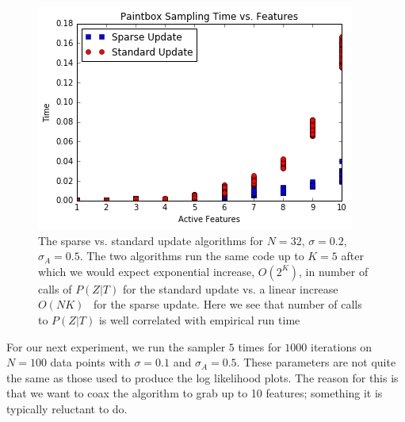 \documentclass{article}
\begin{document}
\begin{figure}[ht]
\vskip 0.2in
\begin{center}
\centerline{\includegraphics[width=\columnwidth]{alg_scatter}}
\caption{The sparse vs. standard update algorithms for $N = 32$, $\sigma = 0.2$, $\sigma_A = 0.5$.  The two algorithms run the same code up to $K = 5$ after which we would expect exponential increase, $O(2^K)$, in number of calls of $P(Z|T)$ for the standard update vs. a linear increase $O(NK)$ \ for the sparse update.  Here we see that number of calls to $P(Z|T)$ is well correlated with empirical run time}
\label{alg_scatter}
\end{center}
\vskip -0.2in
\end{figure}

For our next experiment, we run the sampler $5$ times for $1000$ iterations on $N = 100$ data points with $\sigma = 0.1$ and $\sigma_A = 0.5$.  These parameters are not quite the same as those used to produce the log likelihood plots.  The reason for this is that we want to coax the algorithm to grab up to 10 features; something it is typically reluctant to do.  
\end{document}
